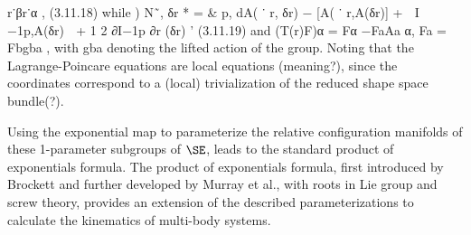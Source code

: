 r˙βr˙α , (3.11.18)
while
)
N˜, δr
*
=
&
p, dA( ˙ r, δr) − [A( ˙ r,A(δr)] +

I
−1p,A(δr)

+
1
2
∂I−1p
∂r
(δr)
'
(3.11.19)
and (T(r)F)α = Fα −FaAa
α, Fa = Fbgba
, with gba
denoting the lifted action
of the group.
Noting that the Lagrange-Poincare equations are local equations (meaning?), since the coordinates correspond to a (local) trivialization of the reduced shape space bundle(?).





Using the exponential map to parameterize the relative configuration manifolds of these 1-parameter subgroups of $\SE$, leads to the standard product of exponentials
formula\cite{Chhabra2014a}. The product of exponentials formula, first introduced by Brockett\cite{brockett1984robotic} and further developed by Murray et al.\cite{murray1994mathematical}, with roots in Lie group and screw theory, provides an extension of the described parameterizations to calculate the kinematics of multi-body systems.